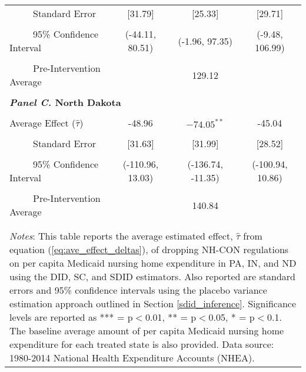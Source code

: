 \documentclass[../Main.tex]{subfiles}
\begin{document}
\begin{table}[htbp]
\begin{tabular}{l*{3}{c}}
\\[-2ex]
\multicolumn{1}{l}{\ \ \ \ \ Standard Error}  &\multicolumn{1}{c}{[31.79]}&\multicolumn{1}{c}{[25.33]}&\multicolumn{1}{c}{[29.71]}\\
\\[-2ex]
\multicolumn{1}{l}{\ \ \ \ \ 95\% Confidence Interval}&   \multicolumn{1}{c}{(-44.11, 80.51)}&   \multicolumn{1}{c}{(-1.96, 97.35)}&   \multicolumn{1}{c}{(-9.48, 106.99)}\\
\\[-2ex]
\multicolumn{1}{l}{\ \ \ \ \ Pre-Intervention Average}&   \multicolumn{3}{c}{129.12}\\
\\[-.1ex]
\multicolumn{4}{l}{\textbf{\textit{Panel C.} North Dakota}}\\
\\[-1.5ex]
\multicolumn{1}{l}{Average Effect ($\hat{\tau}$)}&   \multicolumn{1}{c}{-48.96} &   \multicolumn{1}{c}{$-74.05^{**}$}&  \multicolumn{1}{c}{-45.04}\\
\\[-2ex]
\multicolumn{1}{l}{\ \ \ \ \ Standard Error}  &\multicolumn{1}{c}{[31.63]}&\multicolumn{1}{c}{[31.99]}&\multicolumn{1}{c}{[28.52]}\\
\\[-2ex]
\multicolumn{1}{l}{\ \ \ \ \ 95\% Confidence Interval}&   \multicolumn{1}{c}{(-110.96, 13.03)}&   \multicolumn{1}{c}{(-136.74, -11.35)}&   \multicolumn{1}{c}{(-100.94, 10.86)}\\
\\[-2ex]
\multicolumn{1}{l}{\ \ \ \ \ Pre-Intervention Average}&   \multicolumn{3}{c}{140.84}\\
\\[-.1ex]
\hline\hline
\\[-2ex]
\multicolumn{4}{p{.8\linewidth}}{\footnotesize \textit{Notes}: This table reports the average estimated effect, $\hat{\tau}$ from equation (\ref{eq:ave_effect_deltas}), of dropping NH-CON regulations on per capita Medicaid nursing home expenditure in PA, IN, and ND using the DID, SC, and SDID estimators. Also reported are standard errors and 95\% confidence intervals using the placebo variance estimation approach outlined in Section \ref{sdid_inference}. Significance levels are reported as *** = p$<$0.01, ** = p$<$0.05, * = p$<$0.1. The baseline average amount of per capita Medicaid nursing home expenditure for each treated state is also provided. Data source: 1980-2014 National Health Expenditure Accounts (NHEA).}
\end{tabular}
\end{table}
\vfill
\clearpage
\end{document}
